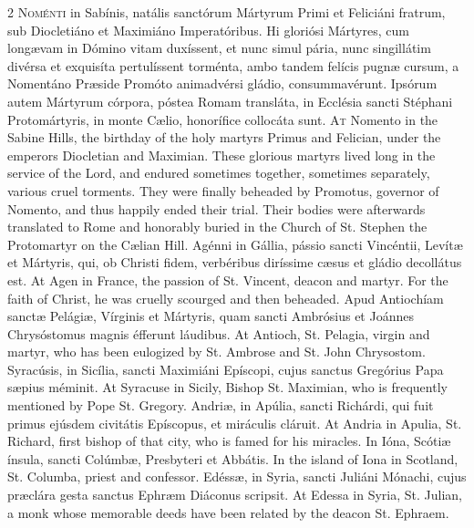 \begin{paracol}{2}
\lettrine[lines=2]{N}{oménti} in Sabínis, 
 natális sanctórum Mártyrum Primi et Feliciáni fratrum, sub Diocletiáno et 
 Maximiáno Imperatóribus. Hi gloriósi Mártyres, cum longævam in Dómino 
 vitam duxíssent, et nunc simul pária, nunc singillátim divérsa et exquisíta 
 pertulíssent torménta, ambo tandem felícis pugnæ cursum, a Nomentáno Præside 
 Promóto animadvérsi gládio, consummavérunt. Ipsórum autem Mártyrum 
 córpora, póstea Romam transláta, in Ecclésia sancti Stéphani Protomártyris, 
 in monte Cælio, honorífice collocáta sunt.
\switchcolumn
{}
\lettrine[lines=2]{A}{t} Nomento in the Sabine Hills, the 
 birthday of the holy martyrs Primus and Felician, under the emperors 
 Diocletian and Maximian. These glorious martyrs lived long in the 
 service of the Lord, and endured sometimes together, sometimes separately, 
 various cruel torments. They were finally beheaded by Promotus, 
 governor of Nomento, and thus happily ended their trial. Their bodies 
 were afterwards translated to Rome and honorably buried in the Church of St. 
 Stephen the Protomartyr on the Cælian Hill.
\switchcolumn*
{}
Agénni in Gállia, 
 pássio sancti Vincéntii, Levítæ et Mártyris, qui, ob Christi fidem, 
 verbéribus diríssime cæsus et gládio decollátus est.
\switchcolumn
{}
At Agen in France, the passion of St. Vincent, deacon and 
 martyr. For the faith of Christ, he was cruelly scourged and then 
 beheaded.
\switchcolumn*
{}
Apud Antiochíam sanctæ 
 Pelágiæ, Vírginis et Mártyris, quam sancti Ambrósius et Joánnes Chrysóstomus 
 magnis éfferunt láudibus.
\switchcolumn
{}
At Antioch, St. Pelagia, virgin and 
 martyr, who has been eulogized by St. Ambrose and St. John Chrysostom.
\switchcolumn*
{}
Syracúsis, in Sicília, 
 sancti Maximiáni Epíscopi, cujus sanctus Gregórius Papa sæpius méminit.
\switchcolumn
{}
At Syracuse in Sicily, Bishop St. 
 Maximian, who is frequently mentioned by Pope St. Gregory.
\switchcolumn*
{}
Andriæ, in Apúlia, 
 sancti Richárdi, qui fuit primus ejúsdem civitátis Epíscopus, et miráculis 
 cláruit.
\switchcolumn
{}
At Andria in Apulia, St. Richard, 
 first bishop of that city, who is famed for his miracles.
\switchcolumn*
{}
In Ióna, Scótiæ ínsula, 
 sancti Colúmbæ, Presbyteri et Abbátis.
\switchcolumn
{}
In the island of Iona in Scotland, 
 St. Columba, priest and confessor.
\switchcolumn*
{}
Edéssæ, in Syria, 
 sancti Juliáni Mónachi, cujus præclára gesta sanctus Ephræm Diáconus 
 scripsit.
\switchcolumn
{}
At Edessa in Syria, St. Julian, a 
 monk whose memorable deeds have been related by the deacon St. Ephraem.
\switchcolumn*
{}
\end{paracol}


